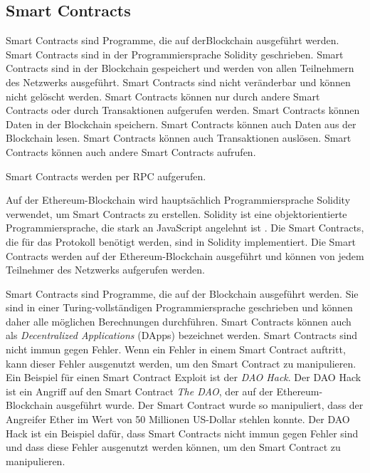 \subsection{Smart Contracts}
\label{subsection:smart_contracts}
Smart Contracts sind Programme, die auf derBlockchain ausgeführt werden. Smart Contracts 
sind in der Programmiersprache Solidity geschrieben. Smart Contracts sind in der Blockchain
gespeichert und werden von allen Teilnehmern des Netzwerks ausgeführt. Smart Contracts sind
nicht veränderbar und können nicht gelöscht werden. Smart Contracts können nur durch andere
Smart Contracts oder durch Transaktionen aufgerufen werden. Smart Contracts können Daten
in der Blockchain speichern. Smart Contracts können auch Daten aus der Blockchain lesen.
Smart Contracts können auch Transaktionen auslösen. Smart Contracts können auch andere
Smart Contracts aufrufen.

Smart Contracts werden per RPC aufgerufen.

Auf der Ethereum-Blockchain wird hauptsächlich Programmiersprache Solidity verwendet, um Smart Contracts zu erstellen. Solidity ist eine objektorientierte Programmiersprache, die stark an JavaScript angelehnt ist \parencite[S. 131]{Antonopoulos_MasteringEthereum}. Die Smart Contracts, die für das Protokoll benötigt werden, sind in Solidity implementiert. Die Smart Contracts werden auf der Ethereum-Blockchain ausgeführt und können von jedem Teilnehmer des Netzwerks aufgerufen werden.

Smart Contracts sind Programme, die auf der Blockchain ausgeführt werden. Sie sind in einer Turing-vollständigen Programmiersprache geschrieben und können daher alle möglichen Berechnungen durchführen. Smart Contracts können auch als \textit{Decentralized Applications} (DApps) bezeichnet werden. Smart Contracts sind nicht immun gegen Fehler. Wenn ein Fehler in einem Smart Contract auftritt, kann dieser Fehler ausgenutzt werden, um den Smart Contract zu manipulieren. Ein Beispiel für einen Smart Contract Exploit ist der \textit{DAO Hack}. Der DAO Hack ist ein Angriff auf den Smart Contract \textit{The DAO}, der auf der Ethereum-Blockchain ausgeführt wurde. Der Smart Contract wurde so manipuliert, dass der Angreifer Ether im Wert von 50 Millionen US-Dollar stehlen konnte. Der DAO Hack ist ein Beispiel dafür, dass Smart Contracts nicht immun gegen Fehler sind und dass diese Fehler ausgenutzt werden können, um den Smart Contract zu manipulieren.